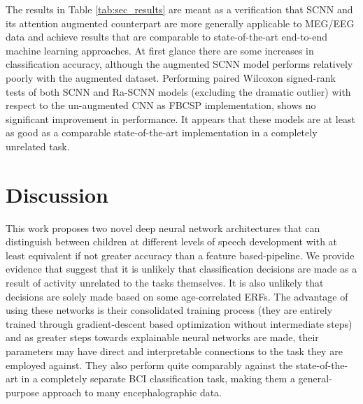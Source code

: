 \documentclass[fleqn,10pt]{wlscirep}
\begin{document}
The results in Table \ref{tab:sec_results} are meant as a verification that SCNN and its attention augmented counterpart are more generally applicable to MEG/EEG data and achieve results that are comparable to state-of-the-art end-to-end machine learning approaches. At first glance there are some increases in classification accuracy, although the augmented SCNN model performs relatively poorly with the augmented dataset. Performing paired Wilcoxon signed-rank tests of both SCNN and Ra-SCNN models (excluding the dramatic outlier) with respect to the un-augmented CNN as FBCSP implementation, shows no significant improvement in performance. It appears that these models are at least as good as a comparable state-of-the-art implementation in a completely unrelated task.


\section*{Discussion}

This work proposes two novel deep neural network architectures that can distinguish between children at different levels of speech development with at least equivalent if not greater accuracy than a feature based-pipeline. We provide evidence that suggest that it is unlikely that classification decisions are made as a result of activity unrelated to the tasks themselves. It is also unlikely that decisions are solely made based on some age-correlated ERFs. The advantage of using these networks is their consolidated training process (they are entirely trained through gradient-descent based optimization without intermediate steps) and as greater steps towards explainable neural networks are made, their parameters may have direct and interpretable connections to the task they are employed against. They also perform quite comparably against the state-of-the-art in a completely separate BCI classification task, making them a general-purpose approach to many encephalographic data.

\end{document}
